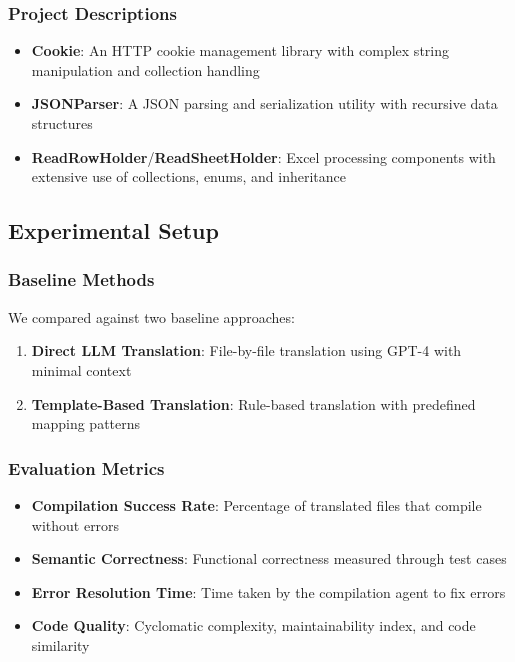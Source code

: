\subsubsection{Project Descriptions}
\begin{itemize}
\item \textbf{Cookie}: An HTTP cookie management library with complex string manipulation and collection handling
\item \textbf{JSONParser}: A JSON parsing and serialization utility with recursive data structures
\item \textbf{ReadRowHolder}/\textbf{ReadSheetHolder}: Excel processing components with extensive use of collections, enums, and inheritance
\end{itemize}

\subsection{Experimental Setup}

\subsubsection{Baseline Methods}
We compared \tool{} against two baseline approaches:

\begin{enumerate}
\item \textbf{Direct LLM Translation}: File-by-file translation using GPT-4 with minimal context
\item \textbf{Template-Based Translation}: Rule-based translation with predefined mapping patterns
\end{enumerate}

\subsubsection{Evaluation Metrics}
\begin{itemize}
\item \textbf{Compilation Success Rate}: Percentage of translated files that compile without errors
\item \textbf{Semantic Correctness}: Functional correctness measured through test cases
\item \textbf{Error Resolution Time}: Time taken by the compilation agent to fix errors
\item \textbf{Code Quality}: Cyclomatic complexity, maintainability index, and code similarity
\end{itemize}

